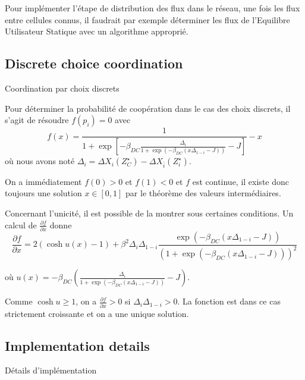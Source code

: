 Pour implémenter l'étape de distribution des flux dans le réseau, une fois les flux entre cellules connus, il faudrait par exemple déterminer les flux de l'Equilibre Utilisateur Statique avec un algorithme approprié.



\subsection{Discrete choice coordination}{Coordination par choix discrets}


Pour déterminer la probabilité de coopération dans le cas des choix discrets, il s'agit de résoudre $f(p_i) = 0$ avec
\[
f(x) = \frac{1}{1+\exp\left[-\beta_{DC}\frac{\Delta_i}{1 + \exp(-\beta_{DC}(x \Delta_{1-i} - J))} - J\right]} - x
\]
où nous avons noté $\Delta_i = \Delta X_{i}(Z^{\star}_{C}) - \Delta X_{\bar{i}}(Z^{\star}_{i})$.

On a immédiatement $f(0) > 0 $ et $f(1) < 0$ et $f$ est continue, il existe donc toujours une solution $x\in [0,1]$ par le théorème des valeurs intermédiaires.

Concernant l'unicité, il est possible de la montrer sous certaines conditions. Un calcul de $\frac{\partial f}{\partial x}$ donne 
\[
\frac{\partial f}{\partial x} = 2 (\cosh u(x) - 1) + \beta^2 \Delta_i \Delta_{1-i} \frac{\exp(-\beta_{DC}(x \Delta_{1-i} - J))}{(1 + \exp(-\beta_{DC}(x \Delta_{1-i} - J)))^2}
\]

où $u(x) = -\beta_{DC} (\frac{\Delta_i}{1 + \exp(-\beta_{DC}(x \Delta_{1-i} - J))} - J)$.

Comme $\cosh u \geq 1$, on a $\frac{\partial f}{\partial x} > 0$ si $\Delta_i \Delta_{1-i} > 0$. La fonction est dans ce cas strictement croissante et on a une unique solution.


\subsection{Implementation details}{Détails d'implémentation}



